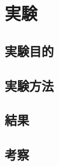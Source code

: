\documentclass[../main]{subfiles}
\begin{document}
\setcounter{secnumdepth}{2}
    \chapter{実験}
    \section{実験目的}
    \section{実験方法}
    \section{結果}
    \section{考察}
\end{document}
